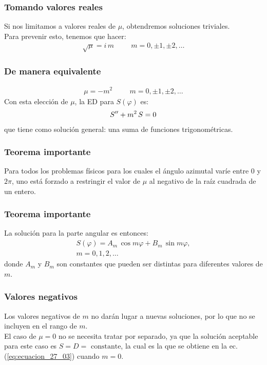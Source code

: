 \documentclass[12pt]{beamer}
\begin{document}
\begin{frame}
\frametitle{Tomando valores reales}
Si nos limitamos a valores reales de $\mu$, obtendremos soluciones triviales.
\\
\bigskip
\pause
Para prevenir esto, tenemos que hacer:
\pause
\begin{align*}
\sqrt{\mu} = i \, m \hspace{1cm} m = 0, \pm 1, \pm 2, \ldots
\end{align*}
\end{frame}
\begin{frame}
\frametitle{De manera equivalente}
\begin{align*}
\mu = -m^{2}  \hspace{1cm} m = 0, \pm 1, \pm 2, \ldots
\end{align*}
\pause
Con esta elección de $\mu$, la ED para $S(\varphi)$ es:
\pause
\begin{align*}
{S}^{\prime \prime} + m^{2} \, S = 0
\end{align*}
\pause
que tiene como solución general: una suma de funciones trigonométricas.
\end{frame}
\begin{frame}
\frametitle{Teorema importante}
Para todos los problemas físicos para los cuales el ángulo azimutal varíe entre $0$ y $2 \pi$, uno está forzado a restringir el valor de $\mu$ al negativo de la raíz cuadrada de un entero.
\end{frame}
\begin{frame}
\frametitle{Teorema importante}
La solución para la parte angular es entonces:
\pause
\begin{equation}
\begin{aligned}
S (\varphi) = A_{m} \, \cos m \varphi + B_{m} \, \sin m \varphi, \\[0.5em]
m = 0, 1, 2, \ldots
\end{aligned}
\label{eq:ecuacion_27_03}
\end{equation}
donde $A_{m}$ y $B_{m}$ son constantes que pueden ser distintas para diferentes valores de $m$.
\end{frame}
\begin{frame}
\frametitle{Valores negativos}
Los valores negativos de $m$ no darán lugar a nuevas soluciones, por lo que no se incluyen en el rango de $m$.
\\
\bigskip
El caso de $\mu = 0$ no se necesita tratar por separado, \pause ya que la solución aceptable para este caso es $S = D = \mbox{ constante}$, la cual es la que se obtiene en la ec. (\ref{eq:ecuacion_27_03}) cuando $m = 0$.
\end{frame}
\end{document}
